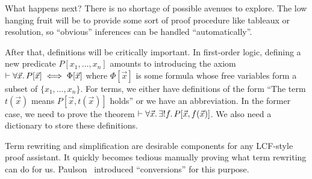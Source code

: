 \begin{node}
What happens next? There is no shortage of possible avenues to
explore. The low hanging fruit will be to provide some sort of proof
procedure like tableaux or resolution, so ``obvious'' inferences can
be handled ``automatically''.

After that, definitions will be critically important. In first-order
logic, defining a new predicate $P[x_{1},\dots,x_{n}]$ amounts to
introducing the axiom $\vdash\forall\vec{x}\ldotp P[\vec{x}]\iff\Phi[\vec{x}]$
where $\Phi[\vec{x}]$ is some formula whose free variables form a
subset of $\{x_{1},\dots,x_{n}\}$. For terms, we either have
definitions of the form ``The term $t(\vec{x})$ means $P[\vec{x},t(\vec{x})]$ holds''
or we have an abbreviation. In the former case, we need to prove
the theorem $\vdash\forall\vec{x}\ldotp\exists!f\ldotp P[\vec{x},f(\vec{x})]$.
We also need a dictionary to store these definitions.

Term rewriting and simplification are desirable components for any
LCF-style proof assistant. It quickly becomes tedious manually proving
what term rewriting can do for us. Paulson~\cite{paulson1983higher} introduced
``conversions'' for this purpose.
\end{node}